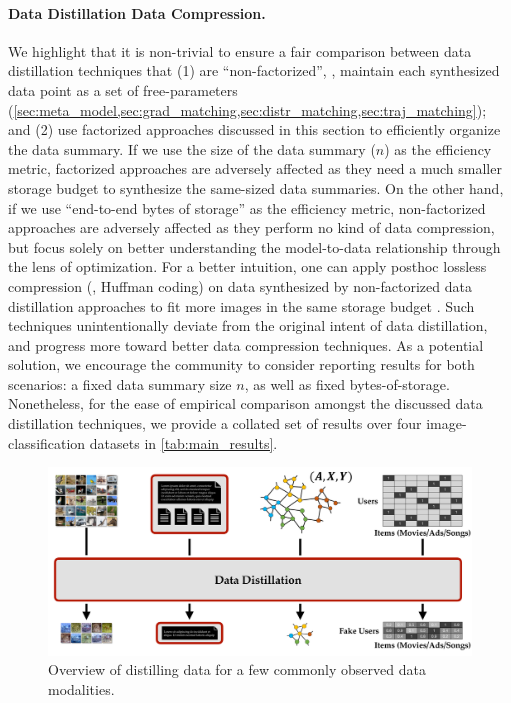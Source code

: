 \documentclass[10pt]{article} %
\begin{document}
\paragraph{Data Distillation \vs Data Compression.} We highlight that it is non-trivial to ensure a fair comparison between data distillation techniques that (1) are ``non-factorized'', \ie, maintain each synthesized data point as a set of free-parameters (\cref{sec:meta_model,sec:grad_matching,sec:distr_matching,sec:traj_matching}); and (2) use factorized approaches discussed in this section to efficiently organize the data summary. If we use the size of the data summary ($n$) as the efficiency metric, factorized approaches are adversely affected as they need a much smaller storage budget to synthesize the same-sized data summaries. On the other hand, if we use ``end-to-end bytes of storage'' as the efficiency metric, non-factorized approaches are adversely affected as they perform no kind of data compression, but focus solely on better understanding the model-to-data relationship through the lens of optimization. For a better intuition, one can apply posthoc lossless compression (\eg, Huffman coding) on data synthesized by non-factorized data distillation approaches to fit more images in the same storage budget \citep{less_is_more}. Such techniques 
unintentionally deviate from the original intent of data distillation, and progress more toward better data compression techniques. 
As a potential solution,
we encourage the community to consider reporting results for both scenarios: a fixed data summary size $n$, as well as fixed bytes-of-storage. Nonetheless, for the ease of empirical comparison amongst the discussed data distillation techniques, we provide a collated set of results over four image-classification datasets in \cref{tab:main_results}.



\begin{figure}[t!] \centering
    \centering
    \includegraphics[width=0.9\linewidth]{figures/data_modalities.pdf}
    \renewcommand\figurename{\href{https://www.noveens.com/images/dd_survey/data_modalities.pdf}{[HQ Image Link]} Figure}
    \caption{Overview of distilling data for a few commonly observed data modalities.}
    \label{fig:data_modalities}
\end{figure}
\end{document}
